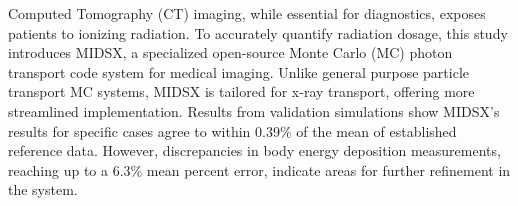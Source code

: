 Computed Tomography (CT) imaging, while essential for diagnostics, exposes patients to ionizing radiation. To accurately quantify radiation dosage, this study introduces MIDSX, a specialized open-source Monte Carlo (MC) photon transport code system for medical imaging. Unlike general purpose particle transport MC systems, MIDSX is tailored for x-ray transport, offering more streamlined implementation. Results from validation simulations show MIDSX's results for specific cases agree to within 0.39\% of the mean of established reference data. However, discrepancies in body energy deposition measurements, reaching up to a 6.3\% mean percent error, indicate areas for further refinement in the system.
